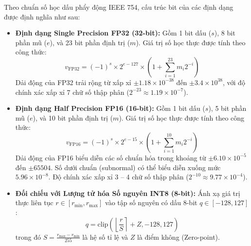 \documentclass[11pt,a4paper]{article}
\begin{document}
Theo chuẩn số học dấu phẩy động IEEE 754, cấu trúc bit của các định dạng được định nghĩa như sau:
\begin{itemize}
    \item \textbf{Định dạng Single Precision FP32 (32-bit):} Gồm 1 bit dấu ($s$), 8 bit phần mũ ($e$), và 23 bit phần định trị ($m$). Giá trị số học thực được tính theo công thức:
    \begin{equation}
    v_{\text{FP32}} = (-1)^s \times 2^{e - 127} \times \left(1 + \sum_{i=1}^{23} m_i 2^{-i}\right)
    \end{equation}
    Dải động của FP32 trải rộng từ xấp xỉ $\pm 1.18 \times 10^{-38}$ đến $\pm 3.4 \times 10^{38}$, với độ chính xác xấp xỉ 7 chữ số thập phân ($2^{-23} \approx 1.19 \times 10^{-7}$).
    \item \textbf{Định dạng Half Precision FP16 (16-bit):} Gồm 1 bit dấu ($s$), 5 bit phần mũ ($e$), và 10 bit phần định trị ($m$). Giá trị số học thực được tính theo công thức:
    \begin{equation}
    v_{\text{FP16}} = (-1)^s \times 2^{e - 15} \times \left(1 + \sum_{i=1}^{10} m_i 2^{-i}\right)
    \end{equation}
    Dải động của FP16 biểu diễn các số chuẩn hóa trong khoảng từ $\pm 6.10 \times 10^{-5}$ đến $\pm 65504$. Số dưới chuẩn (subnormal) có thể biểu diễn xuống mức $5.96 \times 10^{-8}$. Độ chính xác xấp xỉ 3 -- 4 chữ số thập phân ($2^{-10} \approx 9.77 \times 10^{-4}$).
    \item \textbf{Đối chiếu với Lượng tử hóa Số nguyên INT8 (8-bit):} Ánh xạ giá trị thực liên tục $r \in [r_{\min}, r_{\max}]$ vào tập số nguyên có dấu 8-bit $q \in [-128, 127]$:
    \begin{equation}
    q = \text{clip}\left(\left\lfloor \frac{r}{S} \right\rceil + Z, -128, 127\right)
    \end{equation}
    trong đó $S = \frac{r_{\max} - r_{\min}}{255}$ là hệ số tỉ lệ và $Z$ là điểm không (Zero-point).
\end{itemize}
\end{document}
